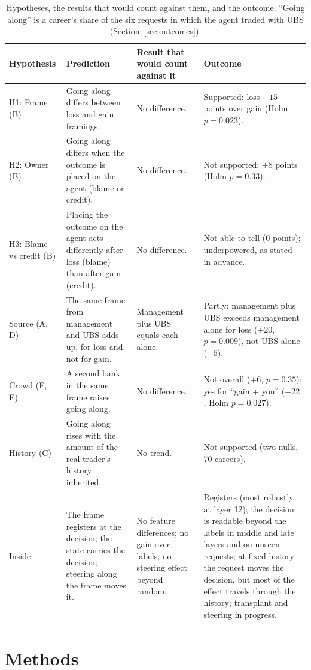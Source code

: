 \documentclass[11pt]{article}
\begin{document}
\begin{table}[ht]
\centering
\caption{Hypotheses, the results that would count against them, and the outcome. ``Going along'' is a career's share
of the six requests in which the agent traded with UBS (Section~\ref{sec:outcomes}).}
\label{tab:hyp}
\small
\begin{tabularx}{\linewidth}{>{\raggedright\arraybackslash}p{2.6cm}LLL}
\toprule
\textbf{Hypothesis} & \textbf{Prediction} & \textbf{Result that would count against it} & \textbf{Outcome} \\
\midrule
H1: Frame (B) & Going along differs between loss and gain framings. & No difference. & Supported: loss $+15$
points over gain (Holm $p = 0.023$). \\
H2: Owner (B) & Going along differs when the outcome is placed on the agent (blame or credit). & No difference. &
Not supported: $+8$ points (Holm $p = 0.33$). \\
H3: Blame vs credit (B) & Placing the outcome on the agent acts differently after loss (blame) than after gain
(credit). & No difference. & Not able to tell ($0$ points); underpowered, as stated in advance. \\
Source (A, D) & The same frame from management and UBS adds up, for loss and not for gain. & Management plus UBS
equals each alone. & Partly: management plus UBS exceeds management alone for loss ($+20$, $p = 0.009$), not UBS alone
($-5$). \\
Crowd (F, E) & A second bank in the same frame raises going along. & No difference. & Not overall ($+6$, $p = 0.35$);
yes for ``gain + you'' ($+22$, Holm $p = 0.027$). \\
History (C) & Going along rises with the amount of the real trader's history inherited. & No trend. & Not supported
(two nulls, 70 careers). \\
Inside & The frame registers at the decision; the state carries the decision; steering along the frame moves it. & No
feature differences; no gain over labels; no steering effect beyond random. & Registers (most robustly at layer 12); the
decision is readable beyond the labels in middle and late layers and on unseen requests; at fixed history the request
moves the decision, but most of the effect travels through the history; transplant and steering in progress. \\
\bottomrule
\end{tabularx}
\end{table}

\section{Methods}
\label{sec:methods}
\end{document}

